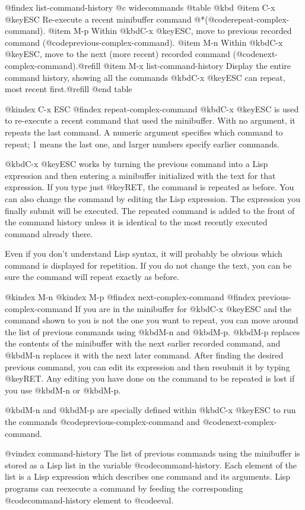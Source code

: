 {{@findex list-command-history
@c widecommands
@table @kbd
@item C-x @key{ESC}
Re-execute a recent minibuffer command @*(@code{repeat-complex-command}).
@item M-p
Within @kbd{C-x @key{ESC}}, move to previous recorded command
(@code{previous-complex-command}).
@item M-n
Within @kbd{C-x @key{ESC}}, move to the next (more recent) recorded
command (@code{next-complex-command}).@refill
@item M-x list-command-history
Display the entire command history, showing all the commands
@kbd{C-x @key{ESC}} can repeat, most recent first.@refill
@end table

@kindex C-x ESC
@findex repeat-complex-command
  @kbd{C-x @key{ESC}} is used to re-execute a recent command that used
the minibuffer. With no argument, it repeats the last command.  A numeric
argument specifies which command to repeat; 1 means the last one, and
larger numbers specify earlier commands.

  @kbd{C-x @key{ESC}} works by turning the previous command into a Lisp
expression and then entering a minibuffer initialized with the text for
that expression.  If you type just @key{RET}, the command is repeated as
before.  You can also change the command by editing the Lisp expression.
The expression you finally submit will be executed.  The repeated
command is added to the front of the command history unless it is
identical to the most recently executed command already there.

  Even if you don't understand Lisp syntax, it will probably be obvious
which command is displayed for repetition.  If you do not change the text,
you can be sure the command will repeat exactly as before.

@kindex M-n
@kindex M-p
@findex next-complex-command
@findex previous-complex-command
  If you are in the minibuffer for @kbd{C-x @key{ESC}} and the command shown
to you is not the one you want to repeat, you can move around the list of
previous commands using @kbd{M-n} and @kbd{M-p}.  @kbd{M-p} replaces the
contents of the minibuffer with the next earlier recorded command, and
@kbd{M-n} replaces it with the next later command.  After finding the
desired previous command, you can edit its expression and then
resubmit it by typing @key{RET}.  Any editing you have done on the
command to be repeated is lost if you use @kbd{M-n} or @kbd{M-p}.

@kbd{M-n} and @kbd{M-p} are specially defined within @kbd{C-x @key{ESC}}
to run the commands @code{previous-complex-command} and
@code{next-complex-command}.

@vindex command-history
  The list of previous commands using the minibuffer is stored as a Lisp
list in the variable @code{command-history}.  Each element of the list
is a Lisp expression which describes one command and its arguments.
Lisp programs can reexecute a command by feeding the corresponding
@code{command-history} element to @code{eval}.

}}
